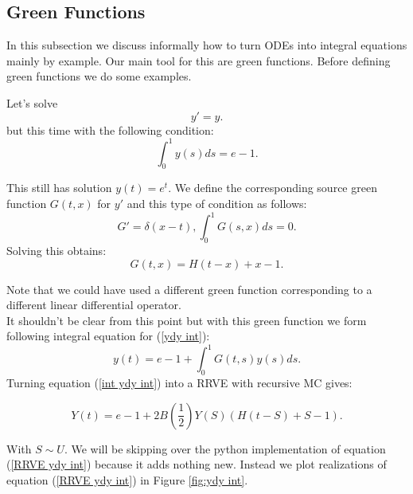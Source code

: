 \documentclass[a4paper,12pt]{article}
\begin{document}
\subsection{Green Functions}
In this subsection we discuss informally how to turn ODEs into integral equations mainly
by example.
Our main tool for this are green functions. Before defining green functions
we do some examples.  \\

\begin{example}[$y'=y$ average condition]
    Let's solve
    \begin{equation} \label{ydy int}
        y'=y.
    \end{equation}
    but this time with the following condition:
    \begin{equation}
        \int_{0}^{1} y(s) ds = e-1.
    \end{equation}

    This still has solution $y(t)=e^{t}$. We define the corresponding source
    green function $G(t,x)$ for $y'$ and this type of condition as follows:
    \begin{equation}
        G'= \delta(x-t), \int_{0}^{1}G(s,x)ds = 0.
    \end{equation}
    Solving this obtains:
    \begin{equation}
        G(t,x) = H(t-x) +x-1.
    \end{equation}

    Note that we could have used a different green function corresponding
    to a different linear differential operator. \\

    It shouldn't be clear from this point but with this green
    function we form following integral equation for (\ref{ydy int}):
    \begin{equation} \label{int ydy int}
        y(t)= e -1 + \int_{0}^{1}G(t,s)y(s)ds.
    \end{equation}
    Turning equation (\ref{int ydy int}) into a RRVE with recursive MC gives:

    \begin{equation}\label{RRVE ydy int}
        Y(t)= e-1 + 2B\left(\frac{1}{2} \right)Y(S)(H(t-S)+S-1) .
    \end{equation}

    With $S \sim U$. We will be skipping over the python implementation of equation (\ref{RRVE ydy int})
    because it adds nothing new.
    Instead we plot realizations of equation (\ref{RRVE ydy int}) in Figure \ref{fig:ydy int}.


\end{example}
\end{document}
